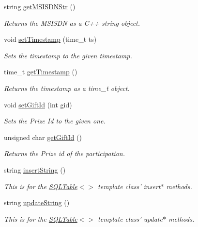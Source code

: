 \begin{CompactItemize}
string \hyperlink{classpartDetails_partDetailsa6}{get\-MSISDNStr} ()
\begin{CompactList}\small\item\em Returns the MSISDN as a C++ string object.\item\end{CompactList}\item 
void \hyperlink{classpartDetails_partDetailsa7}{set\-Timestamp} (time\_\-t ts)
\begin{CompactList}\small\item\em Sets the timestamp to the given timestamp.\item\end{CompactList}\item 
time\_\-t \hyperlink{classpartDetails_partDetailsa8}{get\-Timestamp} ()
\begin{CompactList}\small\item\em Returns the timestamp as a time\_\-t object.\item\end{CompactList}\item 
void \hyperlink{classpartDetails_partDetailsa9}{set\-Gift\-Id} (int gid)
\begin{CompactList}\small\item\em Sets the Prize Id to the given one.\item\end{CompactList}\item 
unsigned char \hyperlink{classpartDetails_partDetailsa10}{get\-Gift\-Id} ()
\begin{CompactList}\small\item\em Returns the Prize id of the participation.\item\end{CompactList}\item 
string \hyperlink{classpartDetails_partDetailsa11}{insert\-String} ()
\begin{CompactList}\small\item\em This is for the \hyperlink{classSQLTable}{SQLTable}$<$$>$ template class' insert$\ast$ methods.\item\end{CompactList}\item 
string \hyperlink{classpartDetails_partDetailsa12}{update\-String} ()
\begin{CompactList}\small\item\em This is for the \hyperlink{classSQLTable}{SQLTable}$<$$>$ template class' update$\ast$ methods.\item\end{CompactList}\item 

\end{CompactItemize}
